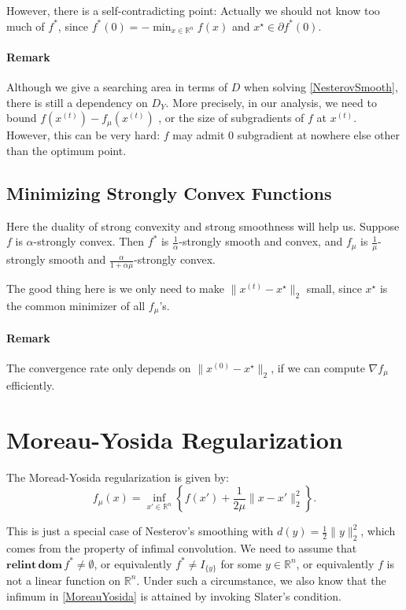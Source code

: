 \documentclass[openany]{book}
\theoremstyle{definition}
\theoremstyle{remark}
\begin{document}
However, there is a self-contradicting point: Actually we should not know too much of $f^*$, since $f^*(0)=-\min_{x\in \mathbb{R}^n}f(x)$ and $x^{\star}\in\partial f^*(0)$.

\paragraph{Remark}
Although we give a searching area in terms of $D$ when solving \eqref{NesterovSmooth}, there is still a dependency on $D_Y$. More precisely, in our analysis, we need to bound $f(x^{(t)})-f_{\mu}(x^{(t)})$ , or the size of subgradients of $f$ at $x^{(t)}$. However, this can be very hard: $f$ may admit $0$ subgradient at nowhere else other than the optimum point.

\subsection{Minimizing Strongly Convex Functions}
Here the duality of strong convexity and strong smoothness will help us. Suppose $f$ is $\alpha$-strongly convex. Then $f^*$ is $\frac{1}{\alpha}$-strongly smooth and convex, and $f_{\mu}$ is $\frac{1}{\mu}$-strongly smooth and $\frac{\alpha}{1+\alpha\mu}$-strongly convex.

The good thing here is we only need to make $\|x^{(t)}-x^{\star}\|_2$ small, since $x^{\star}$ is the common minimizer of all $f_{\mu}$'s.

\paragraph{Remark}
The convergence rate only depends on $\|x^{(0)}-x^{\star}\|_2$, if we can compute $\nabla f_{\mu}$ efficiently.

\section{Moreau-Yosida Regularization}
The Moread-Yosida regularization is given by:
\begin{equation}\label{MoreauYosida}
    f_{\mu}(x)=\inf_{x'\in \mathbb{R}^n}\left\{f(x')+\frac{1}{2\mu}\|x-x'\|_2^2\right\}.
\end{equation}

This is just a special case of Nesterov's smoothing with $d(y)=\frac{1}{2}\|y\|_2^2$, which comes from the property of infimal convolution. We need to assume that $\mathbf{relint}\,\mathbf{dom }\,f^*\ne\emptyset$, or equivalently $f^*\ne I_{\{y\}}$ for some $y\in \mathbb{R}^n$, or equivalently $f$ is not a linear function on $\mathbb{R}^n$. Under such a circumstance, we also know that the infimum in \eqref{MoreauYosida} is attained by invoking Slater's condition.
\end{document}
